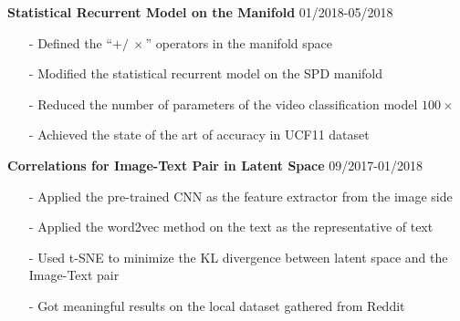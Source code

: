 \documentclass[margin]{res}
\begin{document}
\begin{resume}
                 \vspace{-1em}  

                 \textbf{Statistical Recurrent Model on the Manifold} \hfill 01/2018-05/2018
                \begin{itemize}\itemsep -2.2pt %
                 \item[-] Defined the ``$+/\ \times$'' operators in the manifold space
                 \item[-] Modified the statistical recurrent model on the SPD manifold
                 \item[-] Reduced the number of parameters of the video classification model $100\times$
                 \item[-] Achieved the state of the art of accuracy in UCF11 dataset
                 \end{itemize}

                 \vspace{-1em}  

                 \textbf{Correlations for Image-Text Pair in Latent Space} \hfill 09/2017-01/2018
                \begin{itemize}\itemsep -2.2pt %
                 \item[-] Applied the pre-trained CNN as the feature extractor from the image side 
                 \item[-] Applied the word2vec method on the text as the representative of text
                 \item[-] Used t-SNE to minimize the KL divergence between latent space and the Image-Text pair
                 \item[-] Got meaningful results on the local dataset gathered from Reddit
                 \end{itemize}



\end{resume}
\end{document}

